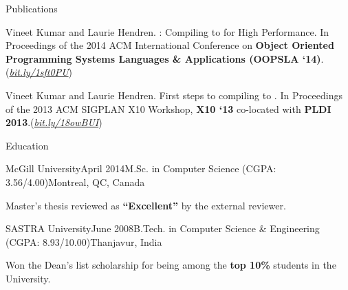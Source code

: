 \documentclass{resume} %
\begin{document}

\begin{rSection}{Publications}
\smallskip
\begin{lSubsection}


\item Vineet Kumar and Laurie Hendren. \mixten: Compiling \matlab to \xten for
	High Performance. In Proceedings of the 2014 ACM International
	Conference on \textbf{Object Oriented Programming Systems Languages \&
	Applications (OOPSLA
	`14)}.(\href{http://bit.ly/1sft0PU}{\em{bit.ly/1sft0PU}})

%
\item Vineet Kumar and Laurie Hendren. First steps to compiling \matlab to
	\xten. In Proceedings of the 2013 ACM SIGPLAN X10 Workshop, \textbf{X10
	`13} co-located with \textbf{PLDI
	2013}.(\href{http://www.sable.mcgill.ca/mclab/mix10/paper.pdf}{\em{bit.ly/18owBUI}})
\end{lSubsection}
\end{rSection}

 
\begin{rSection}{Education}

\begin{rSubsection}{McGill University}{April 2014}{M.Sc. in
Computer Science (CGPA: 3.56/4.00)}{Montreal, QC, Canada} 
\item Master's thesis reviewed as \textbf{``Excellent''} by the external
reviewer.
\end{rSubsection}

\begin{rSubsection}{SASTRA University}{June 2008}{B.Tech. in Computer Science
\& Engineering (CGPA: 8.93/10.00)}{Thanjavur, India} 
\item Won the {Dean's list scholarship} for being among the \textbf{top
10\%} students in the University. 
\end{rSubsection}

\end{rSection}
\end{document}
